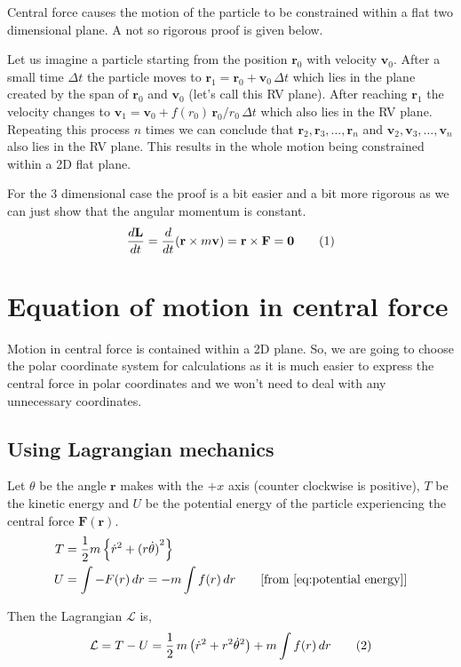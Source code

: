 \documentclass[a4paper, 12pt]{article}
\renewcommand{\indent}{\hspace{3ex}}
\newcommand\labelthis[1]{\addtocounter{equation}{1}\tag{\theequation}\label{#1}}
\renewcommand{\r}{\mathbf{r}}
\renewcommand{\v}{\mathbf{v}}
\renewcommand{\vec}[1]{\mathbf{#1}}
\newcommand{\ddt}[1]{\frac{d#1}{dt}}
\newcommand{\Lagr}{\mathcal{L}}
\begin{document}
\indent Central force causes the motion of the particle to be constrained within a flat two dimensional plane. A not so rigorous proof is given below.

\indent Let us imagine a particle starting from the position $\r_0$ with velocity $\v_0$. After a small time $\Delta t$ the particle moves to $\r_1 = \r_0 + \v_0 \, \Delta t$ which lies in the plane created by the span of $\r_0$ and $\v_0$ (let's call this RV plane). After reaching $\r_1$ the velocity changes to $\v_1 = \v_0 + f(r_0) \, {\r_0}/{r_0} \, \Delta t$ which also lies in the RV plane. Repeating this process $n$ times we can conclude that $ \r_2, \r_3, \dots, \r_n$ and $ \v_2, \v_3, \dots, \v_n$ also lies in the RV plane. This results in the whole motion being constrained within a 2D flat plane.

\indent For the 3 dimensional case the proof is a bit easier and a bit more rigorous as we can just show that the angular momentum is constant.
\[ \ddt{\vec{L}} = \ddt{} (\r \times m \v) = \r \times \vec{F} = \mathbf{0} \labelthis{eq:conserv L vec analysis} \]

\section{Equation of motion in central force}\label{equation of motion}

\indent Motion in central force is contained within a 2D plane. So, we are going to choose the polar coordinate system for calculations as it is much easier to express the central force in polar coordinates and we won't need to deal with any unnecessary coordinates.

\subsection{Using Lagrangian mechanics}\label{eom lagrangian}

\indent Let $\theta$ be the angle $\r$ makes with the $+x$ axis (counter clockwise is positive), $T$ be the kinetic energy and $U$ be the potential energy of the particle experiencing the central force $\vec{F}(\r)$.
\begin{align}
	T &= \frac{1}{2} m \left\{ \dot{r}^2 + {(r \dot{\theta})}^2 \right\} \label{kinetic energy} \\
	U &= \int -F(r) \, dr = - m \int f(r) \, dr \nonumber \tag*{[from~\eqref{eq:potential energy}]}
\end{align}

Then the Lagrangian $\Lagr$ is,
\[ \Lagr = T - U = \frac{1}{2} \, m \left( \dot{r}^2 + r^2 \dot{\theta}^2 \right) + m \int f(r) \, dr 
																					\labelthis{eq:lagrangian} \]
\end{document}
